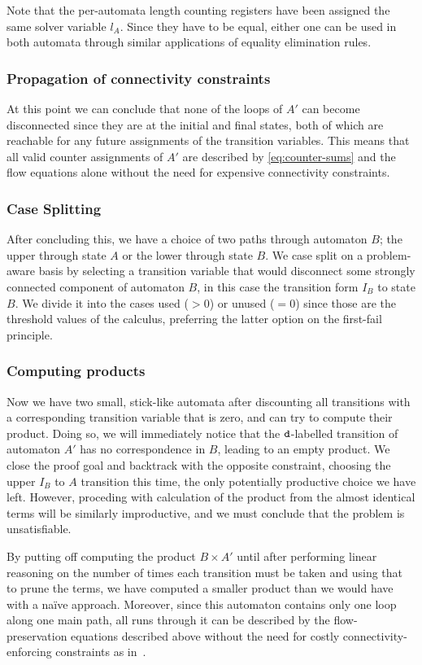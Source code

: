 Note that the per-automata length counting registers have been assigned the same
solver variable $l_A$. Since they have to be equal, either one can be used in
both automata through similar applications of equality elimination rules.

\subsubsection{Propagation of connectivity constraints}
At this point we can conclude that none of the loops of $A'$ can become
disconnected since they are at the initial and final states, both of which are
reachable for any future assignments of the transition variables. This means
that all valid counter assignments of $A'$ are described by
\cref{eq:counter-sums} and the flow equations alone without the need for
expensive connectivity constraints.

\subsubsection{Case Splitting}
After concluding this, we have a choice of two paths through automaton $B$; the
upper through state $A$ or the lower through state $B$. We case split on a
problem-aware basis by selecting a transition variable that would disconnect
some strongly connected component of automaton $B$, in this case the transition
form $I_B$ to state $B$. We divide it into the cases used ($> 0$) or unused ($ =
0$) since those are the threshold values of the calculus, preferring the latter
option on the first-fail principle.

\subsubsection{Computing products}
Now we have two small, stick-like automata after discounting all
transitions with a corresponding transition variable that is zero, and can try
to compute their product. Doing so, we will immediately notice that the
$\texttt{d}$-labelled transition of automaton $A'$ has no correspondence in $B$,
leading to an empty product. We close the proof goal and backtrack with the
opposite constraint, choosing the upper $I_B$ to $A$ transition this time, the
only potentially productive choice we have left. However, proceding with
calculation of the product from the almost identical terms will be similarly
improductive, and we must conclude that the problem is unsatisfiable.

By putting off computing the product $B \times A'$ until after performing linear
reasoning on the number of times each transition must be taken and using that to
prune the terms, we have computed a smaller product than we would have with a
na\"ive approach. Moreover, since this automaton contains only one loop along
one main path, all runs through it can be described by the flow-preservation
equations described above without the need for costly connectivity-enforcing
constraints as in~\cite{generate-parikh-image}.